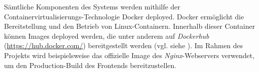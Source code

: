 Sämtliche Komponenten des Systems werden mithilfe der Container\-virtualisierungs-Technologie Docker deployed.
Docker ermöglicht die Bereitstellung und den Betrieb von Linux-Containern.
Innerhalb dieser Container können Images deployed werden, die unter anderem auf \textit{Dockerhub} (\url{https://hub.docker.com/}) 
bereitgestellt werden (vgl. siehe \cite{redhat-docker}).
Im Rahmen des Projekts wird beispielsweise das offizielle Image des \textit{Nginx}-Webservers verwendet, um den 
Production-Build des Frontends bereitzustellen.











